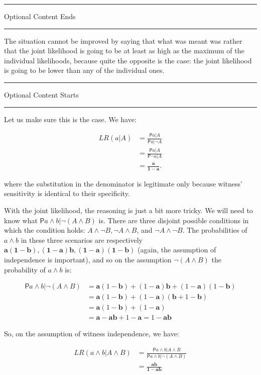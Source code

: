 \documentclass[10pt,dvipsnames,enabledeprecatedfontcommands]{scrartcl}
\newcommand{\n}{\neg}
\newcommand{\et}{\wedge}
\newcommand{\pr}{\mathsf{P}}
\newcommand{\intermezzoa}{
	\begin{minipage}[c]{13cm}
	\begin{center}\rule{10cm}{0.4pt}



	\tiny{\sc Optional Content Starts}
	
	\vspace{-1mm}
	
	\rule{10cm}{0.4pt}\end{center}
	\end{minipage}\nopagebreak 
	}
\newcommand{\intermezzob}{\nopagebreak 
	\begin{minipage}[c]{13cm}
	\begin{center}\rule{10cm}{0.4pt}

	\tiny{\sc Optional Content Ends}
	
	\vspace{-1mm}
	
	\rule{10cm}{0.4pt}\end{center}
	\end{minipage}
	}
\begin{document}
\intermezzob

The situation cannot be improved by saying that what was meant was
rather that the joint likelihood is going to be at least as high as the
maximum of the individual likelihoods, because quite the opposite is the
case: the joint likelihood is going to be lower than any of the
individual ones.

\intermezzoa

Let us make sure this is the case. We have:

\begin{align*}
 LR(a\vert A) & = \frac{\pr{a\vert A}}{\pr{a\vert \n A}}\\
 &= \frac{\pr{a\vert A}}{\pr{\n a\vert  A}} \\
& =  \frac{\mathbf{a}}{\mathbf{1-a}}.
\end{align*}

where the substitution in the denominator is legitimate only because
witness' sensitivity is identical to their specificity.

With the joint likelihood, the reasoning is just a bit more tricky. We
will need to know what \(\pr{a\et b \vert \n (A\et B)}\) is. There are
three disjoint possible conditions in which the condition holds:
\(A\et \n B, \n A \et B\), and \(\n A \et \n B\). The probabilities of
\(a\et b\) in these three scenarios are respectively
\(\mathbf{a(1-b),(1-a)b,(1-a)(1-b)}\) (again, the assumption of
independence is important), and so on the assumption \(\n(A\et B)\) the
probability of \(a\et b\) is:

\begin{align*}
\pr{a\et b \vert \n (A\et B)} & = 
\mathbf{a}(1-\mathbf{b})+(1-\mathbf{a})\mathbf{b}+(1-\mathbf{a})(1-\mathbf{b})\\ 
& = 
\mathbf{a}(1-\mathbf{b})+(1-\mathbf{a})(\mathbf{b} + 1-\mathbf{b})\\
& = \mathbf{a}(1-\mathbf{b})+(1-\mathbf{a})\\
& = \mathbf{a}-\mathbf{a}\mathbf{b}+1-\mathbf{a} = 1- \mathbf{a}\mathbf{b}
\end{align*}

So, on the assumption of witness independence, we have:

\begin{align*}
LR(a\et b \vert A \et B) & = \frac{\pr{a\et b \vert A \et B}}{\pr{a \et b\vert \n (A \et B)}} \\
& = \frac{\mathbf{ab}}{\mathbf{1-ab}}
\end{align*}
\end{document}
